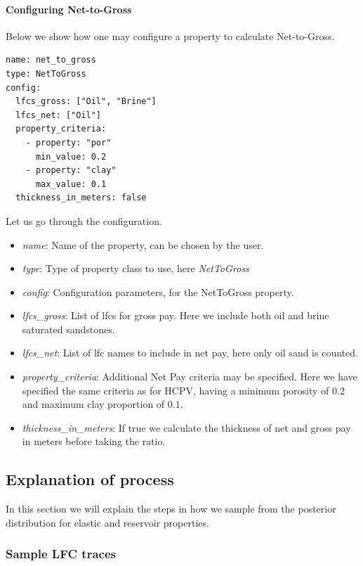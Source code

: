\documentclass[note,screen,english,12pt,utf8]{nrdoc}
\begin{document}
\paragraph{Configuring Net-to-Gross}

Below we show how one may configure a property to calculate Net-to-Gross.
\begin{verbatim}
name: net_to_gross
type: NetToGross
config:
  lfcs_gross: ["Oil", "Brine"]
  lfcs_net: ["Oil"]
  property_criteria:
    - property: "por"
      min_value: 0.2
    - property: "clay"
      max_value: 0.1
  thickness_in_meters: false
\end{verbatim}

Let us go through the configuration.
\begin{itemize}
    \item \emph{name}: Name of the property, can be chosen by the user.
    \item{\emph{type}: Type of property class to use, here \emph{NetToGross}}
    \item \emph{config}: Configuration parameters, for the NetToGross property.
    \item \emph{lfcs\_gross}: List of lfcs for gross pay. Here we include both oil and brine saturated sandstones.
    \item \emph{lfcs\_net}: List of lfc names to include in net pay, here only oil sand is counted.
    \item {
        \emph{property\_criteria}: Additional Net Pay criteria may be
        specified. Here we have specified the same criteria as for HCPV,
        having a minimum porosity of $0.2$ and maximum clay proportion of $0.1$.
    }
    \item {
        \emph{thickness\_in\_meters}: If true we calculate the thickness of net and gross
        pay in meters before taking the ratio.
    }
\end{itemize}


\subsection{Explanation of process}
\label{sec:explanation}

In this section we will explain the steps in how we sample from the
posterior distribution for elastic and reservoir properties.

\subsubsection{Sample LFC traces}
\end{document}
